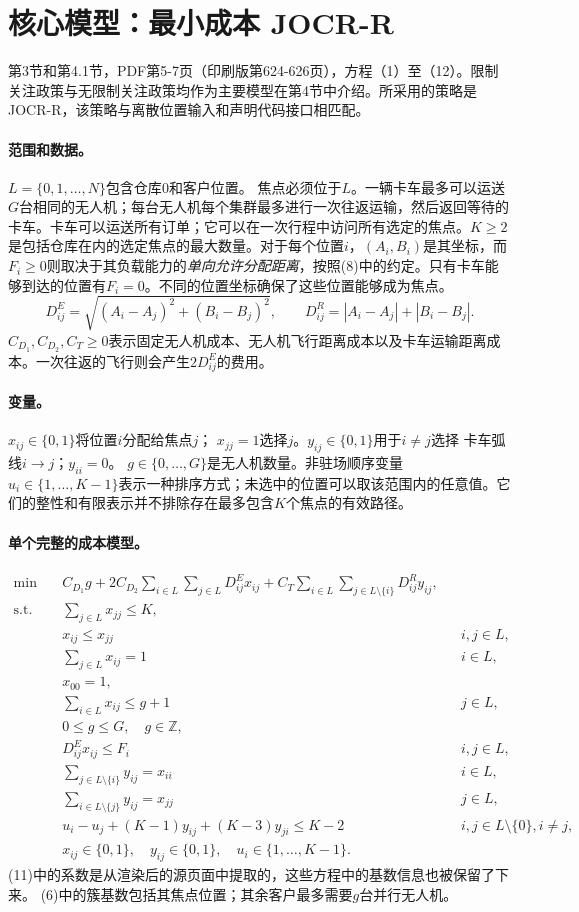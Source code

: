 \documentclass[11pt]{article}
\begin{document}
\section*{核心模型：最小成本 JOCR-R}
第3节和第4.1节，PDF第5-7页（印刷版第624-626页），方程（1）至（12）。限制关注政策与无限制关注政策均作为主要模型在第4节中介绍。所采用的策略是JOCR-R，该策略与离散位置输入和声明代码接口相匹配。
\paragraph{范围和数据。}
$L=\{0,1,\ldots,N\}$包含仓库$0$和客户位置。  
焦点必须位于$L$。一辆卡车最多可以运送$G$台相同的无人机；每台无人机每个集群最多进行一次往返运输，然后返回等待的卡车。卡车可以运送所有订单；它可以在一次行程中访问所有选定的焦点。$K\ge2$是包括仓库在内的选定焦点的最大数量。对于每个位置$i$，$(A_i,B_i)$是其坐标，而$F_i\ge0$则取决于其负载能力的\emph{单向允许分配距离}，按照(8)中的约定。只有卡车能够到达的位置有$F_i=0$。不同的位置坐标确保了这些位置能够成为焦点。
\[
 D^E_{ij}=\sqrt{(A_i-A_j)^2+(B_i-B_j)^2},\qquad
 D^R_{ij}=|A_i-A_j|+|B_i-B_j|.
\]
$C_{D_1},C_{D_2},C_T\ge0$表示固定无人机成本、无人机飞行距离成本以及卡车运输距离成本。一次往返的飞行则会产生$2D^E_{ij}$的费用。
\paragraph{变量。}
$x_{ij}\in\{0,1\}$将位置$i$分配给焦点$j$；  
$x_{jj}=1$选择$j$。$y_{ij}\in\{0,1\}$用于$i\ne j$选择  
卡车弧线$i\to j$；$y_{ii}=0$。  
$g\in\{0,\ldots,G\}$是无人机数量。非驻场顺序变量  
$u_i\in\{1,\ldots,K-1\}$表示一种排序方式；未选中的位置可以取该范围内的任意值。它们的整性和有限表示并不排除存在最多包含$K$个焦点的有效路径。
\paragraph{单个完整的成本模型。}
\begin{align}
\min\quad &C_{D_1}g+2C_{D_2}\sum_{i\in L}\sum_{j\in L}D^E_{ij}x_{ij}
 +C_T\sum_{i\in L}\sum_{j\in L\setminus\{i\}}D^R_{ij}y_{ij},\tag{1}\\
\text{s.t.}\quad &\sum_{j\in L}x_{jj}\le K,\tag{2}\\
&x_{ij}\le x_{jj} &&i,j\in L,\tag{3}\\
&\sum_{j\in L}x_{ij}=1 &&i\in L,\tag{4}\\
&x_{00}=1,\tag{5}\\
&\sum_{i\in L}x_{ij}\le g+1 &&j\in L,\tag{6}\\
&0\le g\le G,\quad g\in\mathbb Z,\tag{7}\\
&D^E_{ij}x_{ij}\le F_i &&i,j\in L,\tag{8}\\
&\sum_{j\in L\setminus\{i\}}y_{ij}=x_{ii} &&i\in L,\tag{9}\\
&\sum_{i\in L\setminus\{j\}}y_{ij}=x_{jj} &&j\in L,\tag{10}\\
&u_i-u_j+(K-1)y_{ij}+(K-3)y_{ji}\le K-2
 &&i,j\in L\setminus\{0\},i\ne j,\tag{11}\\
&x_{ij}\in\{0,1\},\quad y_{ij}\in\{0,1\},\quad
 u_i\in\{1,\ldots,K-1\}.\tag{12}
\end{align}
(11)中的系数是从渲染后的源页面中提取的，这些方程中的基数信息也被保留了下来。  
(6)中的簇基数包括其焦点位置；其余客户最多需要$g$台并行无人机。
\end{document}
